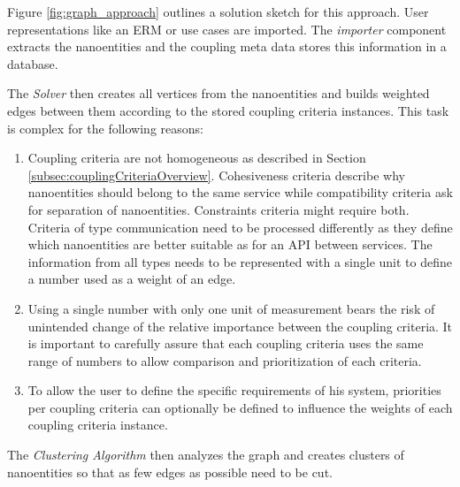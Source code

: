 \begin{minipage}[t]{0.5\textwidth}
	\setlength{\parskip}{5pt plus 0.1pt}
	Figure \ref{fig:graph_approach} outlines a solution sketch for this approach. User representations like an \gls{ERM} or use cases are imported. The \textit{importer} component extracts the nanoentities and the coupling meta data stores this information in a database.
	
	The \textit{Solver} then creates all vertices from the nanoentities and builds weighted edges between them according to the stored coupling criteria instances. This task is complex for the following reasons:
	
	\begin{enumerate}
		\item Coupling criteria are not homogeneous as described in Section \ref{subsec:couplingCriteriaOverview}. Cohesiveness criteria describe why nanoentities should belong to the same service while compatibility criteria ask for separation of nanoentities. Constraints criteria might require both. Criteria of type communication need to be processed differently as they define which nanoentities are better suitable as for an \gls{API} between services. The information from all types needs to be represented with a single unit to define a number used as a weight of an edge.
		
		\item Using a single number with only one unit of measurement bears the risk of unintended change of the relative importance between the coupling criteria. It is important to carefully assure that each coupling criteria uses the same range of numbers to allow comparison and prioritization of each criteria.   
		
		\item To allow the user to define the specific requirements of his system, priorities per coupling criteria can optionally be defined to influence the weights of each coupling criteria instance.
	\end{enumerate}
	
	The \textit{Clustering Algorithm} then analyzes the graph and creates clusters of nanoentities so that as few edges as possible need to be cut.	
	
\end{minipage}
